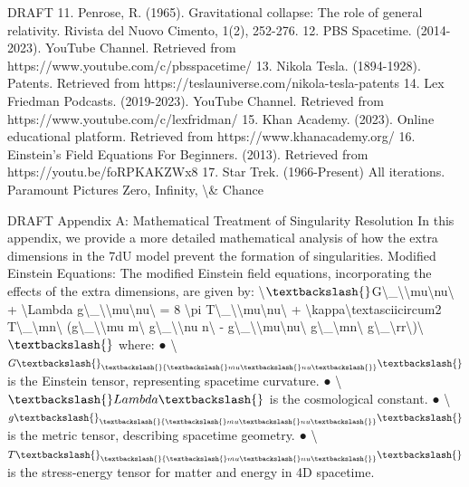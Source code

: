 \documentclass[12pt]{article}
\begin{document}
DRAFT
11. Penrose, R. (1965). Gravitational collapse: The role of
general relativity. Rivista del Nuovo Cimento, 1(2), 252-276.
12. PBS Spacetime. (2014-2023). YouTube Channel. Retrieved
from https://www.youtube.com/c/pbsspacetime/
13. Nikola Tesla. (1894-1928). Patents. Retrieved from
https://teslauniverse.com/nikola-tesla-patents
14. Lex Friedman Podcasts. (2019-2023). YouTube Channel.
Retrieved from https://www.youtube.com/c/lexfridman/
15. Khan Academy. (2023). Online educational platform.
Retrieved from https://www.khanacademy.org/
16. Einstein’s Field Equations For Beginners. (2013). Retrieved
from https://youtu.be/foRPKAKZWx8
17. Star Trek. (1966-Present) All iterations. Paramount Pictures
Zero, Infinity, \textbackslash{}& Chance

DRAFT
Appendix A: Mathematical Treatment of Singularity Resolution
In this appendix, we provide a more detailed mathematical analysis of how the extra
dimensions in the 7dU model prevent the formation of singularities.
Modiﬁed Einstein Equations:
The modiﬁed Einstein ﬁeld equations, incorporating the eﬀects of the extra dimensions,
are given by:
\textbackslash{}$\textbackslash{}$G\textbackslash{}_\textbackslash{}{\textbackslash{}mu\textbackslash{}nu\textbackslash{}} + \textbackslash{}Lambda g\textbackslash{}_\textbackslash{}{\textbackslash{}mu\textbackslash{}nu\textbackslash{}} = 8 \textbackslash{}pi T\textbackslash{}_\textbackslash{}{\textbackslash{}mu\textbackslash{}nu\textbackslash{}} + \textbackslash{}kappa\textbackslash{}textasciicircum{}2 T\textbackslash{}_\textbackslash{}{mn\textbackslash{}} (g\textbackslash{}_\textbackslash{}{\textbackslash{}mu m\textbackslash{}}
g\textbackslash{}_\textbackslash{}{\textbackslash{}nu n\textbackslash{}} - g\textbackslash{}_\textbackslash{}{\textbackslash{}mu\textbackslash{}nu\textbackslash{}} g\textbackslash{}_\textbackslash{}{mn\textbackslash{}} g\textbackslash{}_\textbackslash{}{rr\textbackslash{}})\textbackslash{}$\textbackslash{}$
where:
●
\textbackslash{}$G\textbackslash{}_\textbackslash{}{\textbackslash{}mu\textbackslash{}nu\textbackslash{}}\textbackslash{}$ is the Einstein tensor, representing spacetime curvature.
●
\textbackslash{}$\textbackslash{}Lambda\textbackslash{}$ is the cosmological constant.
●
\textbackslash{}$g\textbackslash{}_\textbackslash{}{\textbackslash{}mu\textbackslash{}nu\textbackslash{}}\textbackslash{}$ is the metric tensor, describing spacetime geometry.
●
\textbackslash{}$T\textbackslash{}_\textbackslash{}{\textbackslash{}mu\textbackslash{}nu\textbackslash{}}\textbackslash{}$ is the stress-energy tensor for matter and energy in 4D spacetime.
\end{document}
